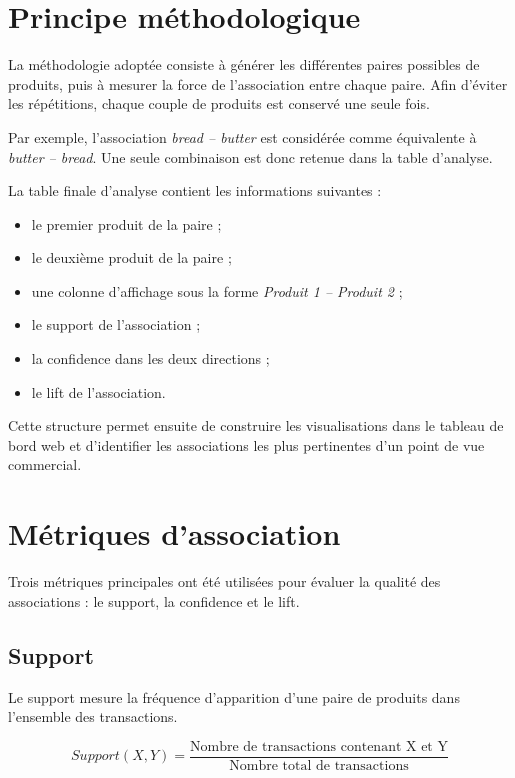 \documentclass[12pt,a4paper,twoside]{report}
\begin{document}
\section{Principe méthodologique}

La méthodologie adoptée consiste à générer les différentes paires possibles de produits, puis à mesurer la force de l'association entre chaque paire. Afin d'éviter les répétitions, chaque couple de produits est conservé une seule fois.

Par exemple, l'association \textit{bread -- butter} est considérée comme équivalente à \textit{butter -- bread}. Une seule combinaison est donc retenue dans la table d'analyse.

La table finale d'analyse contient les informations suivantes :
\begin{itemize}
  \item le premier produit de la paire ;
  \item le deuxième produit de la paire ;
  \item une colonne d'affichage sous la forme \textit{Produit 1 -- Produit 2} ;
  \item le support de l'association ;
  \item la confidence dans les deux directions ;
  \item le lift de l'association.
\end{itemize}

Cette structure permet ensuite de construire les visualisations dans le tableau de bord web et d'identifier les associations les plus pertinentes d'un point de vue commercial.

\section{Métriques d'association}

Trois métriques principales ont été utilisées pour évaluer la qualité des associations : le support, la confidence et le lift.

\subsection{Support}

Le support mesure la fréquence d'apparition d'une paire de produits dans l'ensemble des transactions.

\[
Support(X,Y) = \frac{\text{Nombre de transactions contenant X et Y}}{\text{Nombre total de transactions}}
\]
\end{document}
